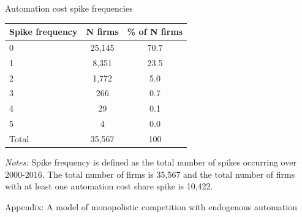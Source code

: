\documentclass[aspectratio=169]{beamer}
\begin{document}
\begin{frame}{Automation cost spike frequencies \hyperlink{spike}{}} \label{spikefrequency}
\footnotesize
\begin{table}[t!]
  \centering
    \begin{threeparttable}
    \begin{tabular}{lcc}
    \toprule
    \textbf{Spike frequency} & \textbf{N firms} & \textbf{\% of N firms} \\
    \midrule
    0     & 25,145 & 70.7 \\
    1     & 8,351 & 23.5 \\
    2     & 1,772 & 5.0 \\
    3     & 266   & 0.7 \\
    4     & 29    & 0.1 \\
    5     & 4     & 0.0 \\
    Total & 35,567 & 100 \\
    \bottomrule
    \end{tabular}%
    \begin{tablenotes}
           \item \emph{Notes:} Spike frequency is defined as the total number of spikes occurring over 2000-2016. The total number of firms is 35,567 and the total number of firms with at least one automation cost share spike is 10,422.
           \end{tablenotes}
          \end{threeparttable}
\end{table}%
\end{frame}

\begin{frame}
\begin{center}
{\Large Appendix: A model of monopolistic competition with endogenous automation}
\end{center}
\end{frame}
\end{document}
